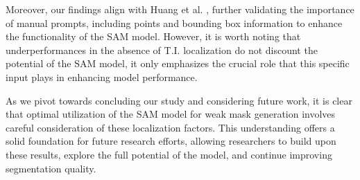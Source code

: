 Moreover, our findings align with Huang et al. \cite{huang2023segment}, further validating the importance of manual prompts, including points and bounding box information to enhance the functionality of the SAM model. However, it is worth noting that underperformances in the absence of T.I. localization do not discount the potential of the SAM model, it only emphasizes the crucial role that this specific input plays in enhancing model performance.

As we pivot towards concluding our study and considering future work, it is clear that optimal utilization of the SAM model for weak mask generation involves careful consideration of these localization factors. This understanding offers a solid foundation for future research efforts, allowing researchers to build upon these results, explore the full potential of the model, and continue improving segmentation quality.